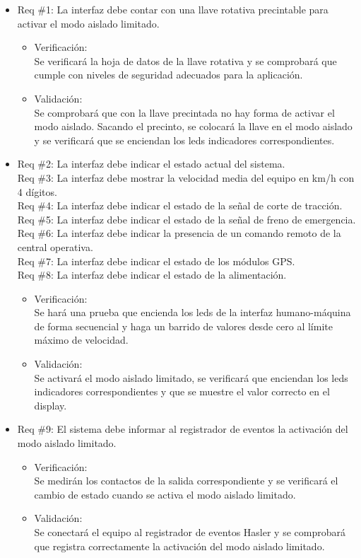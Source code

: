 \documentclass[11pt]{charter}
\begin{document}
\begin{itemize}
\item Req \#1: La interfaz debe contar con una llave rotativa precintable para activar el modo aislado limitado.
\begin{itemize}
  \item Verificación:\\
  Se verificará la hoja de datos de la llave rotativa y se comprobará que cumple con niveles de seguridad adecuados para la aplicación.
  \item Validación:\\
  Se comprobará que con la llave precintada no hay forma de activar el modo aislado. Sacando el precinto, se colocará la llave en el modo aislado y se verificará que se enciendan los leds indicadores correspondientes.
\end{itemize}

\item Req \#2: La interfaz debe indicar el estado actual del sistema. \\
Req \#3: La interfaz debe mostrar la velocidad media del equipo en km/h con 4 dígitos. \\
Req \#4: La interfaz debe indicar el estado de la señal de corte de tracción. \\
Req \#5: La interfaz debe indicar el estado de la señal de freno de emergencia. \\
Req \#6: La interfaz debe indicar la presencia de un comando remoto de la central operativa. \\
Req \#7: La interfaz debe indicar el estado de los módulos GPS. \\
Req \#8: La interfaz debe indicar el estado de la alimentación.
\begin{itemize}
  \item Verificación:\\
  Se hará una prueba que encienda los leds de la interfaz humano-máquina de forma secuencial y haga un barrido de valores desde cero al límite máximo de velocidad.
  \item Validación:\\
  Se activará el modo aislado limitado, se verificará que enciendan los leds indicadores correspondientes y que se muestre el valor correcto en el display.
\end{itemize}

\item Req \#9: El sistema debe informar al registrador de eventos la activación del modo aislado limitado.
\begin{itemize}
  \item Verificación:\\
  Se medirán los contactos de la salida correspondiente y se verificará el cambio de estado cuando se activa el modo aislado limitado.
  \item Validación:\\
  Se conectará el equipo al registrador de eventos Hasler y se comprobará que registra correctamente la activación del modo aislado limitado.
\end{itemize}


\end{itemize}
\end{document}

